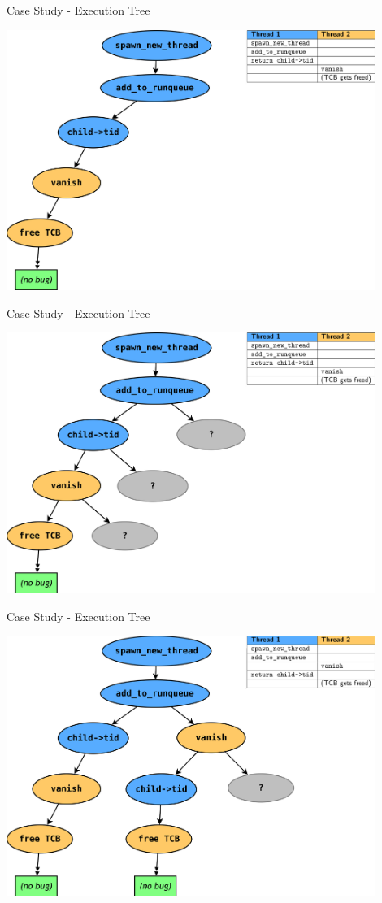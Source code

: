 \documentclass[xcolor=dvipsnames]{beamer}
\begin{document}
\begin{frame}{Case Study - Execution Tree}
	\begin{center}
		\includegraphics[width=0.9\textwidth]{threadfork0.png}
	\end{center}
\end{frame}
\begin{frame}{Case Study - Execution Tree}
	\begin{center}
		\includegraphics[width=0.9\textwidth]{threadfork05.png}
	\end{center}
\end{frame}
\begin{frame}{Case Study - Execution Tree}
	\begin{center}
		\includegraphics[width=0.9\textwidth]{threadfork1.png}
	\end{center}
\end{frame}
\end{document}

